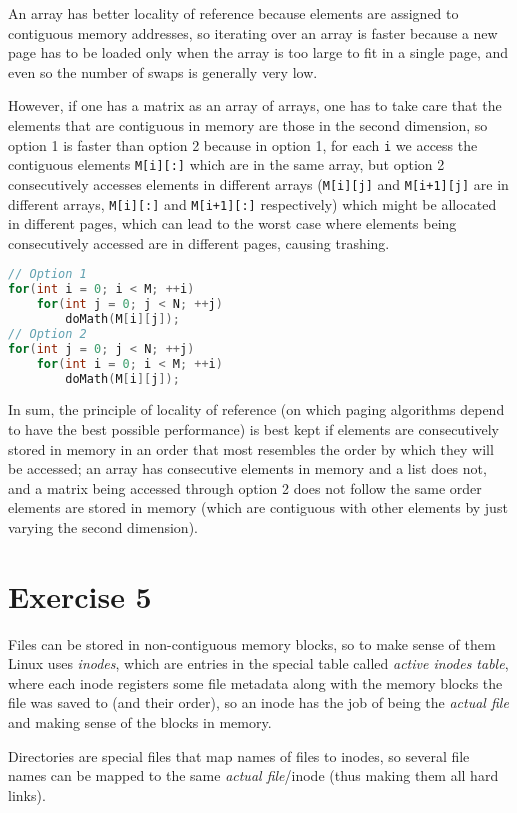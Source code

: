{An array has better locality of reference because elements are assigned to contiguous memory addresses, so iterating over an array is faster because a new page has to be loaded only when the array is too large to fit in a single page, and even so the number of swaps is generally very low.

However, if one has a matrix as an array of arrays, one has to take care that the elements that are contiguous in memory are those in the second dimension, so option 1 is faster than option 2 because in option 1, for each \texttt{i} we access the contiguous elements \texttt{M[i][:]} which are in the same array, but option 2 consecutively accesses elements in different arrays (\texttt{M[i][j]} and \texttt{M[i+1][j]} are in different arrays, \texttt{M[i][:]} and \texttt{M[i+1][:]} respectively) which might be allocated in different pages, which can lead to the worst case where elements being consecutively accessed are in different pages, causing trashing.

\begin{lstlisting}[language=C]
// Option 1
for(int i = 0; i < M; ++i)
    for(int j = 0; j < N; ++j)
        doMath(M[i][j]);
// Option 2
for(int j = 0; j < N; ++j)
    for(int i = 0; i < M; ++i)
        doMath(M[i][j]);
\end{lstlisting}

In sum, the principle of locality of reference (on which paging algorithms depend to have the best possible performance) is best kept if elements are consecutively stored in memory in an order that most resembles the order by which they will be accessed; an array has consecutive elements in memory and a list does not, and a matrix being accessed through option 2 does not follow the same order elements are stored in memory (which are contiguous with other elements by just varying the second dimension).

\section{Exercise 5}
Files can be stored in non-contiguous memory blocks, so to make sense of them Linux uses \emph{inodes}, which are entries in the special table called \emph{active inodes table}, where each inode registers some file metadata along with the memory blocks the file was saved to (and their order), so an inode has the job of being the \emph{actual file} and making sense of the blocks in memory.

Directories are special files that map names of files to inodes, so several file names can be mapped to the same \emph{actual file}/inode (thus making them all hard links).

}
